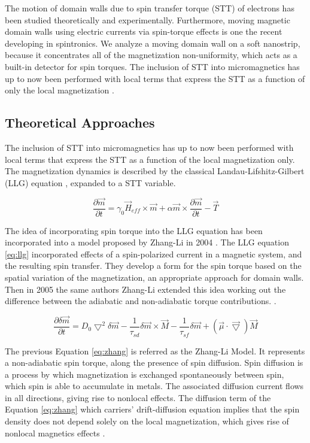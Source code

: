 The motion of domain walls due to spin transfer torque (STT) of electrons has been studied theoretically and experimentally. Furthermore, moving magnetic domain walls using electric currents via spin-torque effects is one the recent developing in spintronics. We analyze a moving domain wall on a soft nanostrip, because it concentrates all of the magnetization non-uniformity, which acts as a built-in detector for spin torques. The inclusion of STT into micromagnetics has up to now been performed with local terms that express the STT as a function of only the local magnetization \cite{claudio}.
 
\subsection{Theoretical Approaches}

The inclusion of STT into micromagnetics has up to now been performed with local terms that express the STT as a function of the local magnetization only. The magnetization dynamics is described by the classical Landau-Lifshitz-Gilbert (LLG) equation \cite{claudio}, expanded to a STT variable. 

\begin{equation}  \label{eq:llg}
	\frac{\partial \vec{m}}{\partial t} = \gamma_0\vec{H}_{eff} \times \vec{m} + \alpha \vec{m} \times \frac{\partial \vec{m}}{\partial t} - \vec{T}
\end{equation}

The idea of incorporating spin torque into the LLG equation has been incorporated into a model proposed by Zhang-Li in 2004 \cite{zhang2004}. The LLG equation \ref{eq:llg} incorporated effects of a spin-polarized current in a magnetic system, and the resulting spin transfer. They develop a form for the spin torque based on the spatial variation of the magnetization, an appropriate approach for domain walls. Then in 2005 the same authors Zhang-Li extended this idea working out the difference between the adiabatic and non-adiabatic torque contributions. \cite{zhang}.

\begin{equation} \label{eq:zhang}
 \frac{\partial \delta \vec{m} }{\partial t} =  D_{0}\bigtriangledown^{2} \delta \vec{m} - \frac{1}{\tau_{sd}} \delta \vec{m} \times \vec{M} - \frac{1}{\tau_{sf}}\delta \vec{m} +(\vec{\mu} \cdot\vec{\bigtriangledown} )\vec{M}
\end{equation}

The previous Equation \ref{eq:zhang} is referred as the Zhang-Li Model. It represents a non-adiabatic spin torque, along the presence of spin diffusion. Spin diffusion is a process by which magnetization is exchanged spontaneously between spin, which spin is able to accumulate in metals. The associated diffusion current flows in all directions, giving rise to nonlocal effects. The diffusion term of the Equation \ref{eq:zhang} which carriers’ drift-diffusion equation implies that the spin density does not depend solely on the local magnetization, which gives rise of nonlocal magnetics effects \cite{claudio}. 

